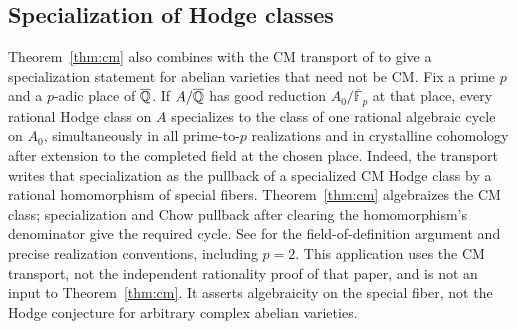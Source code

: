 \subsection{Specialization of Hodge classes}

\begin{remark}
\label{cc:algebraic-specialization}
Theorem~\ref{thm:cm} also combines with the CM transport of
\cite[Corollary~3.4]{OpenAIMilneRationality2026} to give a
specialization statement for abelian varieties that need not be CM.
Fix a prime \(p\) and a \(p\)-adic place of \(\overline{\mathbb{Q}}\).
If \(A/\overline{\mathbb{Q}}\) has good reduction \(A_0/\overline{\mathbb F}_p\)
at that place, every rational Hodge class on \(A\) specializes to
the class of one rational algebraic cycle on \(A_0\), simultaneously
in all prime-to-\(p\) realizations and in crystalline cohomology
after extension to the completed field at the chosen place.
Indeed, the transport writes that specialization as the pullback of
a specialized CM Hodge class by a rational homomorphism of special
fibers. Theorem~\ref{thm:cm} algebraizes the CM class; specialization
and Chow pullback after clearing the homomorphism's denominator give
the required cycle. See
\cite[Corollary~6.4]{OpenAIMilneRationality2026} for the
field-of-definition argument and precise realization conventions,
including \(p=2\). This application uses the CM transport, not the
independent rationality proof of that paper, and is not an input to
Theorem~\ref{thm:cm}. It asserts algebraicity on the special fiber,
not the Hodge conjecture for arbitrary complex abelian varieties.
\end{remark}
